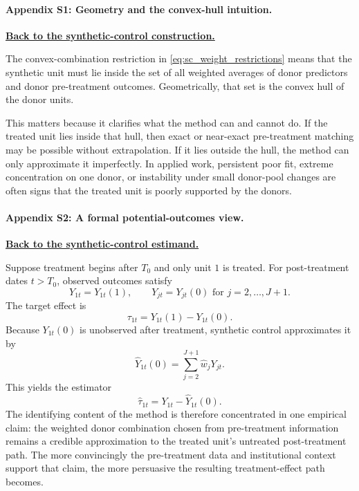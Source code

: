 \paragraph{Appendix S1: Geometry and the convex-hull intuition.}
\hyperlink{main:sc-weights}{\textbf{Back to the synthetic-control construction.}}

The convex-combination restriction in \eqref{eq:sc_weight_restrictions} means that the synthetic unit must lie inside the set of all weighted averages of donor predictors and donor pre-treatment outcomes. Geometrically, that set is the convex hull of the donor units.

This matters because it clarifies what the method can and cannot do. If the treated unit lies inside that hull, then exact or near-exact pre-treatment matching may be possible without extrapolation. If it lies outside the hull, the method can only approximate it imperfectly. In applied work, persistent poor fit, extreme concentration on one donor, or instability under small donor-pool changes are often signs that the treated unit is poorly supported by the donors.

\hypertarget{app:sc-formal}{}
\paragraph{Appendix S2: A formal potential-outcomes view.}
\hyperlink{main:sc-po}{\textbf{Back to the synthetic-control estimand.}}

Suppose treatment begins after $T_0$ and only unit $1$ is treated. For post-treatment dates $t>T_0$, observed outcomes satisfy
\[
Y_{1t} = Y_{1t}(1),
\qquad
Y_{jt} = Y_{jt}(0) \text{ for } j=2,\ldots,J+1.
\]
The target effect is
\[
\tau_{1t} = Y_{1t}(1)-Y_{1t}(0).
\]
Because $Y_{1t}(0)$ is unobserved after treatment, synthetic control approximates it by
\[
\widehat{Y}_{1t}(0) = \sum_{j=2}^{J+1}\hat{w}_j Y_{jt}.
\]
This yields the estimator
\[
\hat{\tau}_{1t}=Y_{1t}-\widehat{Y}_{1t}(0).
\]
The identifying content of the method is therefore concentrated in one empirical claim: the weighted donor combination chosen from pre-treatment information remains a credible approximation to the treated unit's untreated post-treatment path. The more convincingly the pre-treatment data and institutional context support that claim, the more persuasive the resulting treatment-effect path becomes.

